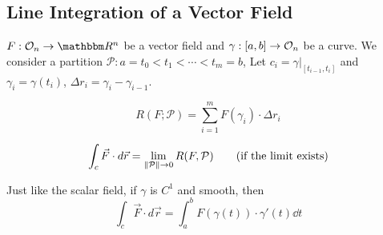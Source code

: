 \documentclass[../Analysis-3]{subfiles}
\begin{document}
\subsection{Line Integration of a Vector Field}

$F:\Op{n} \to \R^n$ be a vector field and $\gamma:[a,b] \to \mathcal{O}_{n}$ be a curve. We consider a partition $\mathcal{P}: a =t_0<t_1<\cdots < t_m=b$, Let $c_i = \gamma|_{[t_{i-1},t_i]}$ and $\gamma_i = \gamma(t_i)$, $\Delta r_i = \gamma_{i} - \gamma_{i-1}$.

\[R(F;\mathcal{P})= \sum_{i=1}^m F(\gamma_i)\cdot \Delta r_i\]

\begin{align*}
    \int_c \vec{F}\cdot d\vec{r} = \lim_{\norm{\mathcal{P}}\to 0} R(F,\mathcal{P}) \tag{if the limit exists}
\end{align*}

Just like the scalar field, if $\gamma$ is $C^1$ and smooth, then
\begin{equation}
    \int_c \vec{F}\cdot d\vec{r} = \int_a^b F(\gamma(t))\cdot \gamma'(t) \dd t \label{eq:3}
\end{equation}
\end{document}
